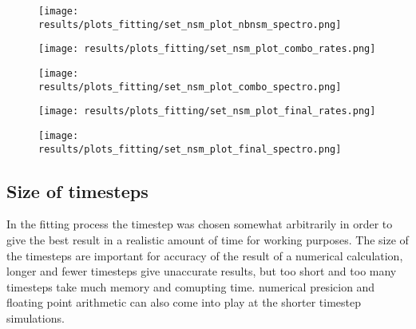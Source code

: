 \begin{figure}
  \begin{minipage}[t][][t]{0.49\textwidth}
    \centering
    \texttt{[image: results/plots\_fitting/set\_nsm\_plot\_nbnsm\_spectro.png]}
    \caption[\todo nbnsm spectro plot ]{
      \label{fig:fit-v3-number-euro}
    }
    \texttt{[image: results/plots\_fitting/set\_nsm\_plot\_combo\_rates.png]}
    \caption[\todo 'combo' rate plot ]{
      \label{fig:fit-v3-combo-nsmr}
    }
  \end{minipage}
  \begin{minipage}[t][][t]{0.49\textwidth}
    \centering
    \texttt{[image: results/plots\_fitting/set\_nsm\_plot\_combo\_spectro.png]}
    \caption[\todo combo'spectro' plot]{
      \label{fig:fit-v3-combo-euro}
    }
    \texttt{[image: results/plots\_fitting/set\_nsm\_plot\_final\_rates.png]}
    \caption[\todo final rate plot]{
      \label{fig:fit-v3-nsmr}
    }
  \end{minipage}
  \centering
  \begin{minipage}[h][][t]{0.49\textwidth}
    \centering
    \texttt{[image: results/plots\_fitting/set\_nsm\_plot\_final\_spectro.png]}
    \caption[\todo final spectro plot]{
      \label{fig:fit-v3-final-euro}
    }
  \end{minipage}
\end{figure}

\begin{table}[h]
  \caption[\omegamodel-parameters from fitting r-process events to \eris]{
    \label{tab:fitting-parameters-nsm}
  }
\end{table}
\FloatBarrier

\subsection{Size of timesteps}
In the fitting process the timestep was chosen somewhat arbitrarily in order to give the best result in a realistic amount of time for working purposes. The size of the timesteps are important for accuracy of the result of a numerical calculation, longer and fewer timesteps give unaccurate results, but too short and too many timesteps take much memory and comupting time. numerical presicion and floating point arithmetic can also come into play at the shorter timestep simulations.

